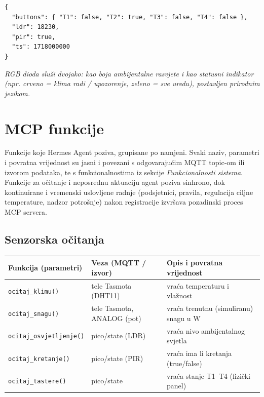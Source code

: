 \documentclass[11pt,a4paper]{article}
\begin{document}
\begin{lstlisting}[style=json,caption={Objava: picoETF -> sistem (timXX/pico/state)},captionpos=b]
{
  "buttons": { "T1": false, "T2": true, "T3": false, "T4": false },
  "ldr": 18230,
  "pir": true,
  "ts": 1718000000
}
\end{lstlisting}

\textit{RGB dioda služi dvojako: kao boja ambijentalne rasvjete i kao statusni indikator
      (npr. crveno = klima radi / upozorenje, zeleno = sve uredu), postavljen prirodnim jezikom.}

\section{MCP funkcije}

Funkcije koje Hermes Agent poziva, grupisane po namjeni. Svaki naziv, parametri i
povratna vrijednost su jasni i povezani s odgovarajućim MQTT topic-om ili izvorom
podataka, te s funkcionalnostima iz sekcije \emph{Funkcionalnosti sistema}. Funkcije za
očitanje i neposrednu aktuaciju agent poziva sinhrono, dok kontinuirane i vremenski
uslovljene radnje (podsjetnici, pravila, regulacija ciljne temperature, nadzor potrošnje)
nakon registracije izvršava pozadinski proces MCP servera.

\subsection{Senzorska očitanja}
\begin{tabularx}{\textwidth}{@{}L{0.32\textwidth} L{0.26\textwidth} X@{}}
      \toprule
      \textbf{Funkcija (parametri)}   & \textbf{Veza (MQTT / izvor)} & \textbf{Opis i povratna vrijednost}   \\
      \midrule
      \texttt{ocitaj\_klimu()}        & tele Tasmota (DHT11)         & vraća temperaturu i vlažnost          \\
      \texttt{ocitaj\_snagu()}        & tele Tasmota,  ANALOG (pot)  & vraća trenutnu (simuliranu) snagu u W \\
      \texttt{ocitaj\_osvjetljenje()} & pico/state (LDR)             & vraća nivo ambijentalnog svjetla      \\
      \texttt{ocitaj\_kretanje()}     & pico/state (PIR)             & vraća ima li kretanja (true/false)    \\
      \texttt{ocitaj\_tastere()}      & pico/state                   & vraća stanje T1--T4 (fizički panel)   \\
      \bottomrule
\end{tabularx}
\end{document}
